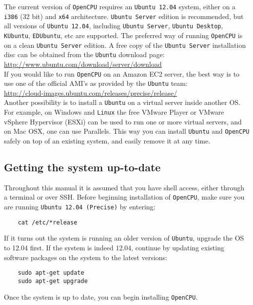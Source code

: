 \documentclass{scrartcl}
\begin{document}
\noindent The current version of \texttt{OpenCPU} requires an \texttt{Ubuntu
12.04} system, either on a \texttt{i386} (32 bit) and \texttt{x64} architecture.
\texttt{Ubuntu Server} edition is recommended, but all versions of
\texttt{Ubuntu 12.04}, including \texttt{Ubuntu Server}, \texttt{Ubuntu
Desktop}, \texttt{KUbuntu}, \texttt{EDUbuntu}, etc are supported. The preferred
way of running \texttt{OpenCPU} is on a clean \texttt{Ubuntu Server} edition. A
free copy of the \texttt{Ubuntu Server} installation disc can be obtained from
the \texttt{Ubuntu} download page: \\

\url{http://www.ubuntu.com/download/server/download} \\

\noindent If you would like to run \texttt{OpenCPU} on an Amazon EC2 server, the best way
is to use one of the official AMI's as provided by the \texttt{Ubuntu} team: \\

\url{http://cloud-images.ubuntu.com/releases/precise/release/} \\

\noindent Another possibility is to install a \texttt{Ubuntu} on a virtual server inside
another OS. For example, on Windows and \texttt{Linux} the free VMware Player or VMware
vSphere Hypervisor (ESXi) can be used to run one or more virtual servers, and on
Mac OSX, one can use Parallels. This way you can install \texttt{Ubuntu} and \texttt{OpenCPU}
safely on top of an existing system, and easily remove it at any time.

\subsection{Getting the system up-to-date}

\noindent Throughout this manual it is assumed that you have shell access,
either through a terminal or over SSH. Before beginning installation of
\texttt{OpenCPU}, make sure you are running \texttt{Ubuntu 12.04 (Precise)} by
entering:

\begin{verbatim}
    cat /etc/*release
\end{verbatim}
If it turns out the system is running an older version of \texttt{Ubuntu}, upgrade the OS
to 12.04 first. If the system is indeed 12.04, continue by updating existing
software packages on the system to the latest versions:

\begin{verbatim}
    sudo apt-get update
    sudo apt-get upgrade
\end{verbatim}
Once the system is up to date, you can begin installing \texttt{OpenCPU}.
\end{document}
